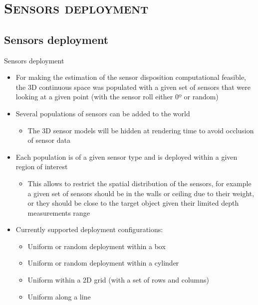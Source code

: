 \section{\scshape Sensors deployment}
\subsection*{Sensors deployment}
\begin{frame}{Sensors deployment}
	\begin{itemize}
		\item For making the estimation of the sensor disposition computational feasible, the 3D continuous space was populated with a given set of sensors that were looking at a given point (with the sensor roll either 0º or random)
		\item Several populations of sensors can be added to the world
			\begin{itemize}
				\item The 3D sensor models will be hidden at rendering time to avoid occlusion of sensor data
			\end{itemize}
		\item Each population is of a given sensor type and is deployed within a given region of interest 
		\begin{itemize}
			\item This allows to restrict the spatial distribution of the sensors, for example a given set of sensors should be in the walls or ceiling due to their weight, or they should be close to the target object given their limited depth measurements range
		\end{itemize}
		\item Currently supported deployment configurations:
		\begin{itemize}
			\item Uniform or random deployment within a box
			\item Uniform or random deployment within a cylinder
			\item Uniform within a 2D grid (with a set of rows and columns)
			\item Uniform along a line
		\end{itemize}
	\end{itemize}
\end{frame}

